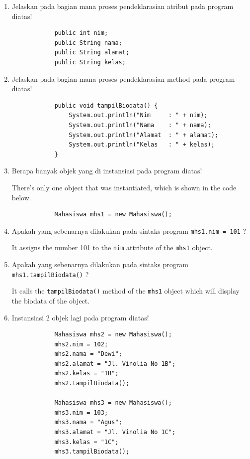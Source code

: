 \documentclass[12pt,titlepage]{article}
\begin{document}
\pagebreak

\begin{enumerate}
    \item {
        Jelaskan pada bagian mana proses pendeklarasian atribut pada program diatas!

        \begin{verbatim}
            public int nim;
            public String nama;
            public String alamat;
            public String kelas;
        \end{verbatim}
    }
    \item {
        Jelaskan pada bagian mana proses pendeklarasian method pada program diatas!

        \begin{verbatim}
            public void tampilBiodata() {
                System.out.println("Nim     : " + nim);
                System.out.println("Nama    : " + nama);
                System.out.println("Alamat  : " + alamat);
                System.out.println("Kelas   : " + kelas);
            }
        \end{verbatim}
    }
    \item {
        Berapa banyak objek yang di instansiasi pada program diatas!

        There's only one object that was instantiated, which is shown in the code below.

        \begin{verbatim}
            Mahasiswa mhs1 = new Mahasiswa();
        \end{verbatim}
    }
    \item {
        Apakah yang sebenarnya dilakukan pada sintaks program \texttt{mhs1.nim = 101} ?

        It assigns the number 101 to the \texttt{nim} attribute of the \texttt{mhs1} object.
    }
    \item {
        Apakah yang sebenarnya dilakukan pada sintaks program \texttt{mhs1.tampilBiodata()} ?

        It calls the \texttt{tampilBiodata()} method of the \texttt{mhs1} object which will
        display the biodata of the object.
    }
    \item {
        Instansiasi 2 objek lagi pada program diatas!

        \begin{verbatim}
            Mahasiswa mhs2 = new Mahasiswa();
            mhs2.nim = 102;
            mhs2.nama = "Dewi";
            mhs2.alamat = "Jl. Vinolia No 1B";
            mhs2.kelas = "1B";
            mhs2.tampilBiodata();

            Mahasiswa mhs3 = new Mahasiswa();
            mhs3.nim = 103;
            mhs3.nama = "Agus";
            mhs3.alamat = "Jl. Vinolia No 1C";
            mhs3.kelas = "1C";
            mhs3.tampilBiodata();
        \end{verbatim}
    }
\end{enumerate}
\end{document}
